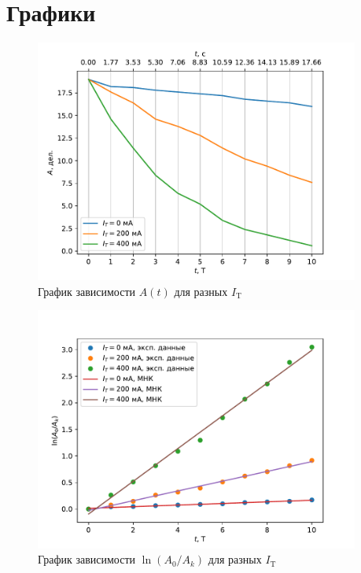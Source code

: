 \section{Графики}

\begin{figure}
	\includegraphics[width=0.95\textwidth]{figures/amplitude_t.pdf}
	\caption{График зависимости $A(t)$ для разных $I_\text{T}$}
\end{figure}

\begin{figure}
	\includegraphics[width=0.95\textwidth]{figures/log_dec.pdf}
	\caption{График зависимости $\ln(A_0 / A_k)$ для разных $I_\text{T}$}
\end{figure}
